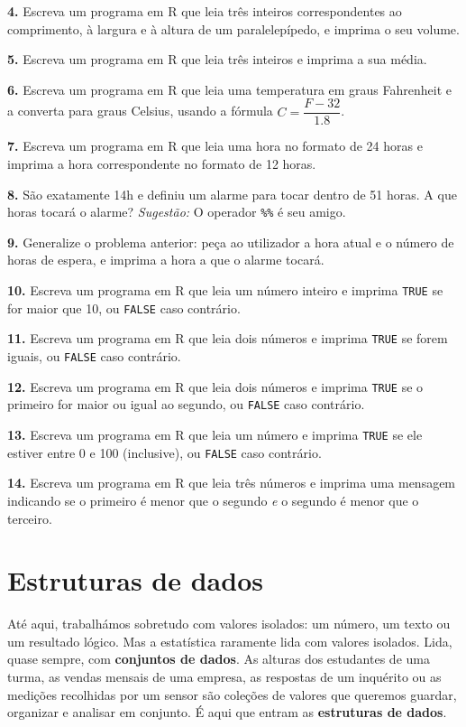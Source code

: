\documentclass[
  portuguese,
  11pt,
  openany]{book}
\begin{document}
\textbf{4.} Escreva um programa em R que leia três inteiros correspondentes ao
comprimento, à largura e à altura de um paralelepípedo, e imprima o seu volume.

\textbf{5.} Escreva um programa em R que leia três inteiros e imprima a sua média.

\textbf{6.} Escreva um programa em R que leia uma temperatura em graus Fahrenheit e a converta para graus Celsius, usando a fórmula \(C = \dfrac{F - 32}{1.8}\).

\textbf{7.} Escreva um programa em R que leia uma hora no formato de 24 horas e
imprima a hora correspondente no formato de 12 horas.

\textbf{8.} São exatamente 14h e definiu um alarme para tocar dentro de 51 horas. A que horas tocará o alarme?
\emph{Sugestão:} O operador \texttt{\%\%} é seu amigo.

\textbf{9.} Generalize o problema anterior: peça ao utilizador a hora atual e o número de horas de espera, e imprima a hora a que o alarme tocará.

\textbf{10.} Escreva um programa em R que leia um número inteiro e imprima \texttt{TRUE} se for maior que 10, ou \texttt{FALSE} caso contrário.

\textbf{11.} Escreva um programa em R que leia dois números e imprima \texttt{TRUE} se forem iguais, ou \texttt{FALSE} caso contrário.

\textbf{12.} Escreva um programa em R que leia dois números e imprima \texttt{TRUE} se o
primeiro for maior ou igual ao segundo, ou \texttt{FALSE} caso contrário.

\textbf{13.} Escreva um programa em R que leia um número e imprima \texttt{TRUE} se ele
estiver entre 0 e 100 (inclusive), ou \texttt{FALSE} caso contrário.

\textbf{14.} Escreva um programa em R que leia três números e imprima uma mensagem indicando se o primeiro é menor que o segundo \emph{e} o segundo é menor que o terceiro.

\chapter{Estruturas de dados}\label{estruturas}

Até aqui, trabalhámos sobretudo com valores isolados: um número, um texto ou um resultado lógico. Mas a estatística raramente lida com valores isolados. Lida, quase sempre, com \textbf{conjuntos de dados}. As alturas dos estudantes de uma turma, as vendas mensais de uma empresa, as respostas de um inquérito ou as medições recolhidas por um sensor são coleções de valores que queremos guardar, organizar e analisar em conjunto. É aqui que entram as \textbf{estruturas de dados}.
\end{document}
